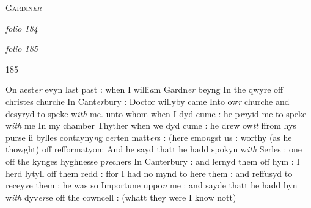 \documentclass[12pt, a4paper]{book}
\begin{document}
            			
				\begin{center} \begin{large} {\scshape Gardin\textit{er}} \end{large} \end{center}
			
               
\dotfill
					

\textit{folio 184}


               \vspace{4cm}
               
\dotfill
					

\textit{folio 185}
            		
            		\begin{flushright}{\color{Mahogany}185}\end{flushright}
            		
            			
			
            			
				\marginpar[\vspace{0.5cm}{\textcolor{Gray}{n}}]{}
			
            			
		\ifthenelse{\isodd{\thepage}}
		{\reversemarginpar}
		{\normalmarginpar}
		On aest\textit{er} evyn last past : when I willi\textit{a}m
            			Gardn\textit{er} beyng In the qwyre off christes churche
            				In Cant\textit{er}bury : Doctor
            					willyby came Into ow\textit{r} churche and desyryd to speke
            			w\textit{ith} me. unto whom when I dyd cume : he p\textit{ra}yid
            			me to speke w\textit{ith} me In my chamber Thyther when we dyd cume : he
            			drew ow\textit{tt} ffrom hys purse ii bylles
            			co\textit{n}tayny\textit{n}g c\textit{er}ten
            			matt\textit{er}s : (here emo\textit{n}gst us : worthy (as he
            			thowght) off refformatyon: And he sayd thatt he hadd spokyn w\textit{ith}
            			Serles : one off the kynges hyghnesse
            				p\textit{re}chers In Canterbury : and
            			lernyd them off hym : I herd lytyll off them redd : ffor I had no mynd to here
            			them : and reffusyd to receyve them : he was so Importune uppo\textit{n}
            			me : and sayde thatt he hadd byn w\textit{ith} dyv\textit{er}se off
            			the cowncell : (whatt they were I know nott) 
            			
\end{document}
